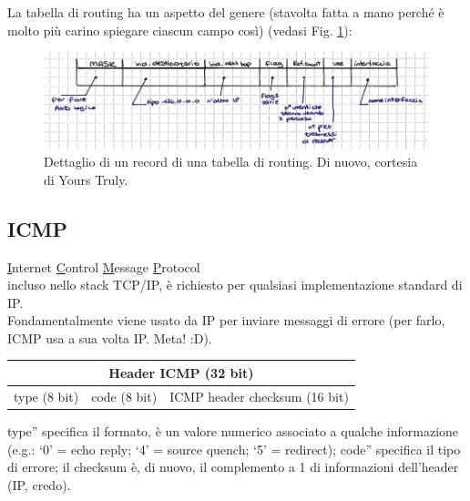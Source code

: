 \newpage
\noindent La tabella di routing ha un aspetto del genere (stavolta fatta a mano perché è molto più carino spiegare ciascun campo così) (vedasi Fig. \ref{fig:routingtable}):

\begin{figure} [h]
    \centering
    \includegraphics[width=1\linewidth]{Figures//05/routingtable.png}
    \caption{Dettaglio di un record di una tabella di routing. Di nuovo, cortesia di Yours Truly.}
    \label{fig:routingtable}
\end{figure}

\subsection*{ICMP}
\underline{I}nternet \underline{C}ontrol \underline{M}essage \underline{P}rotocol\\
incluso nello stack TCP/IP, è richiesto per qualsiasi implementazione standard di IP.\\

\noindent Fondamentalmente viene usato da IP per inviare messaggi di errore (per farlo, ICMP usa a sua volta IP. Meta! :D).\\


\begin{table}[h]
\centering
\begin{tabular}{ccc}
\multicolumn{3}{c}{Header ICMP (32 bit)}                                                                                    \\ \hline
\multicolumn{1}{|c|}{type (8 bit)} & \multicolumn{1}{c|}{code (8 bit)} & \multicolumn{1}{c|}{ICMP header checksum (16 bit)} \\ \hline
\end{tabular}
\end{table}

\noindent \openapex type'' specifica il formato, è un valore numerico associato a qualche informazione (e.g.: `0' = echo reply; `4' = source quench; `5' = redirect); \openapex code'' specifica il tipo di errore; il checksum è, di nuovo, il complemento a 1 di informazioni dell'header (IP, credo).\\

